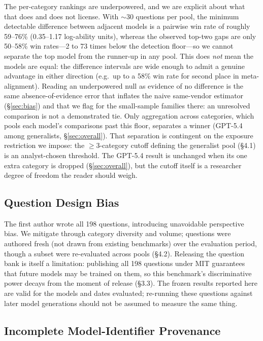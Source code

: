 \documentclass{article}
\begin{document}
The per-category rankings are underpowered, and we are explicit about what that does and does not license. With $\sim$30 questions per pool, the minimum detectable difference between adjacent models is a pairwise win rate of roughly 59--76\% (0.35--1.17 log-ability units), whereas the observed top-two gaps are only 50--58\% win rates---2 to 73 times below the detection floor---so we cannot separate the top model from the runner-up in any pool. This does \emph{not} mean the models are equal: the difference intervals are wide enough to admit a genuine advantage in either direction (e.g.\ up to a 58\% win rate for second place in meta-alignment). Reading an underpowered null as evidence of no difference is the same absence-of-evidence error that inflates the naive same-vendor estimator (\S\ref{sec:bias}) and that we flag for the small-sample families there: an unresolved comparison is not a demonstrated tie. Only aggregation across categories, which pools each model's comparisons past this floor, separates a winner (GPT-5.4 among generalists, \S\ref{sec:overall}). That separation is contingent on the exposure restriction we impose: the $\geq 3$-category cutoff defining the generalist pool (\S4.1) is an analyst-chosen threshold. The GPT-5.4 result is unchanged when its one extra category is dropped (\S\ref{sec:overall}), but the cutoff itself is a researcher degree of freedom the reader should weigh.

\subsection{Question Design Bias}

The first author wrote all 198 questions, introducing unavoidable perspective bias. We mitigate through category diversity and volume; questions were authored fresh (not drawn from existing benchmarks) over the evaluation period, though a subset were re-evaluated across pools (\S4.2). Releasing the question bank is itself a limitation: publishing all 198 questions under MIT guarantees that future models may be trained on them, so this benchmark's discriminative power decays from the moment of release (\S3.3). The frozen results reported here are valid for the models and dates evaluated; re-running these questions against later model generations should not be assumed to measure the same thing.

\subsection{Incomplete Model-Identifier Provenance}
\label{sec:repro_gap}
\end{document}
